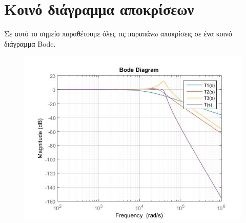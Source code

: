 \documentclass{article}
\begin{document}
{\section*{Κοινό διάγραμμα αποκρίσεων} 
\large{}
Σε αυτό το σημείο παραθέτουμε όλες τις παραπάνω αποκρίσεις σε ένα κοινό διάγραμμα Bode.
\begin{figure}[h!]
\centering
 	\advance\leftskip-5cm
  \includegraphics[width=220mm,scale=2]{t_all.jpg}
\end{figure} 
\newpage
}
\end{document}
